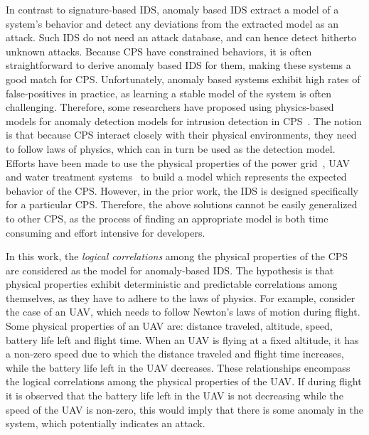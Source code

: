 In contrast to signature-based \ac{IDS}, anomaly based \ac{IDS} extract a model of a system's behavior and detect any deviations from the extracted model as an attack. Such \ac{IDS} do not need an attack database, and can hence detect hitherto unknown attacks. Because \ac{CPS} have constrained behaviors, it is often straightforward to derive anomaly based \ac{IDS} for them, making these systems a good match for \ac{CPS}. Unfortunately, anomaly based systems exhibit high rates of false-positives in practice, as learning a stable model of the system is often challenging. Therefore, some researchers have proposed using physics-based models for anomaly detection models for intrusion detection in \ac{CPS}~\cite{ mitchell2012specification,mitchell2014adaptive,choudhari2013stability,chen2018learning,zohrevand2016hidden}. The notion is that because \ac{CPS} interact closely with their physical environments, they need to follow laws of physics, which can in turn be used as the detection model. 
Efforts have been made to use the physical properties of the power grid~\cite{choudhari2013stability,paul2014unified}, \ac{UAV}~\cite{mitchell2012specification} and water treatment systems~\cite{adepu2016using} to build a model which represents the expected behavior of the \ac{CPS}. However, in the prior work, the \ac{IDS} is designed specifically for a particular \ac{CPS}. Therefore, the above solutions cannot be easily generalized to other \ac{CPS}, as the process of finding an appropriate model is both time consuming and effort intensive for developers. 

In this work, the {\em logical correlations} among the physical properties of the \ac{CPS} are considered as the model for anomaly-based \ac{IDS}. The hypothesis is that physical properties exhibit deterministic and predictable correlations among themselves, as they have to adhere to the laws of physics. For example, consider the case of an \ac{UAV}, which needs to follow Newton's laws of motion during flight. Some physical properties of an \ac{UAV} are: distance traveled, altitude, speed, battery life left and flight time. When an \ac{UAV} is flying at a fixed altitude, it has a non-zero speed due to which the distance traveled and flight time increases, while the battery life left in the \ac{UAV} decreases. These relationships encompass the logical correlations among the physical properties of the \ac{UAV}. If during flight it is observed that the battery life left in the \ac{UAV} is not decreasing while the speed of the \ac{UAV} is non-zero, this would imply that there is some anomaly in the system, which potentially indicates an attack.

